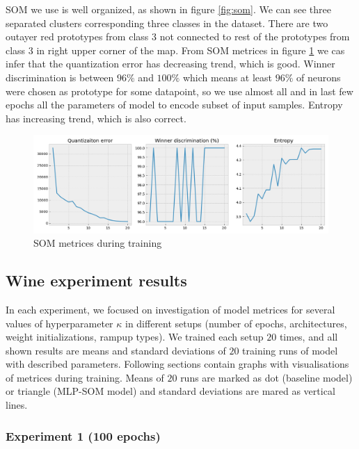 SOM we use is well organized, as shown in figure \ref{fig:som}. We can see three separated clusters corresponding three classes in the dataset. There are two outayer red prototypes from class 3 not connected to rest of the prototypes from class 3 in right upper corner of the map. From SOM metrices in figure \ref{fig:som-metrices} we cas infer that the quantization error has decreasing trend, which is good. Winner discrimination is between $96\%$ and $100\%$ which means at least $96\%$ of neurons were chosen as prototype for some datapoint, so we use almost all and in last few epochs all the parameters of model to encode subset of input samples. Entropy has increasing trend, which is also correct.


\begin{figure}[h!]
    \centering
    \includegraphics[width=1\textwidth]{figs/som-stats.png}
    \caption{SOM metrices during training}
    \label{fig:som-metrices}
\end{figure}

\newpage
\subsection{Wine experiment results}

In each experiment, we focused on investigation of model metrices for several values of hyperparameter $\kappa$ in different setups (number of epochs, architectures, weight initializations, rampup types). We trained each setup $20$ times, and all shown results are means and standard deviations of $20$ training runs of model with described parameters. Following sections contain graphs with visualisations of metrices during training. Means of $20$ runs are marked as dot (baseline model) or triangle (MLP-SOM model) and standard deviations are mared as vertical lines. 

\subsubsection{Experiment 1 (100 epochs)}

